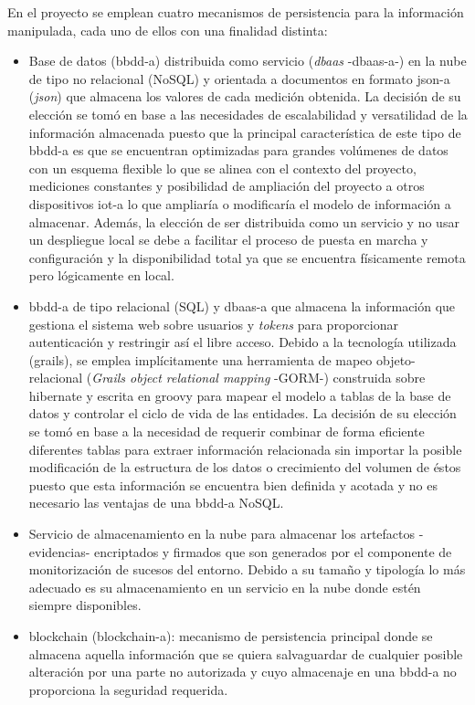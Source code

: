 \documentclass[12pt,a4paper, twoside]{report}
\begin{document}
	En el proyecto se emplean cuatro mecanismos de persistencia para la información manipulada, cada uno de ellos con una finalidad distinta:
	
	\begin{itemize}
		\item Base de datos (\gls{bbdd-a}) distribuida como servicio (\textit{\gls{dbaas}} -\gls{dbaas-a}-) \cite{gonzalez:2011:TCCS} en la nube de tipo no relacional (NoSQL) y orientada a documentos en formato \gls{json-a} (\textit{\gls{json}}) que almacena los valores de cada medición obtenida. La decisión de su elección se tomó en base a las necesidades de escalabilidad y versatilidad de la información almacenada puesto que la principal característica de este tipo de \gls{bbdd-a} es que se encuentran optimizadas para grandes volúmenes de datos con un esquema flexible lo que se alinea con el contexto del proyecto, mediciones constantes y posibilidad de ampliación del proyecto a otros dispositivos \gls{iot-a} lo que ampliaría o modificaría el modelo de información a almacenar. Además, la elección de ser distribuida como un servicio y no usar un despliegue local se debe a facilitar el proceso de puesta en marcha y configuración y la disponibilidad total ya que se encuentra físicamente remota pero lógicamente en local.
		
		\item \gls{bbdd-a} de tipo relacional (SQL) y \gls{dbaas-a} que almacena la información que gestiona el sistema web sobre usuarios  y \textit{\glspl{token}} para proporcionar autenticación y restringir así el libre acceso. Debido a la tecnología utilizada (\gls{grails}), se emplea implícitamente una herramienta de mapeo objeto-relacional (\textit{Grails object relational mapping} -GORM-) construida sobre \gls{hibernate} y escrita en \gls{groovy} para mapear el modelo a tablas de la base de datos y controlar el ciclo de vida de las entidades. La decisión de su elección se tomó en base a la necesidad de requerir combinar de forma eficiente diferentes tablas para extraer información relacionada sin importar la posible modificación de la estructura de los datos o crecimiento del volumen de éstos puesto que esta información se encuentra bien definida y acotada y no es necesario las ventajas de una \gls{bbdd-a} NoSQL. 
		 
		\item Servicio de almacenamiento en la nube para almacenar los artefactos -evidencias- encriptados y firmados que son generados por el componente de monitorización de sucesos del entorno. Debido a su tamaño y tipología lo más adecuado es su almacenamiento en un servicio en la nube donde estén siempre disponibles.	
		\item \Gls{blockchain} (\gls{blockchain-a}): mecanismo de persistencia principal donde se almacena aquella información que se quiera salvaguardar de cualquier posible alteración por una parte no autorizada y cuyo almacenaje en una \gls{bbdd-a} no proporciona la seguridad requerida.
	\end{itemize}
	
\end{document}
